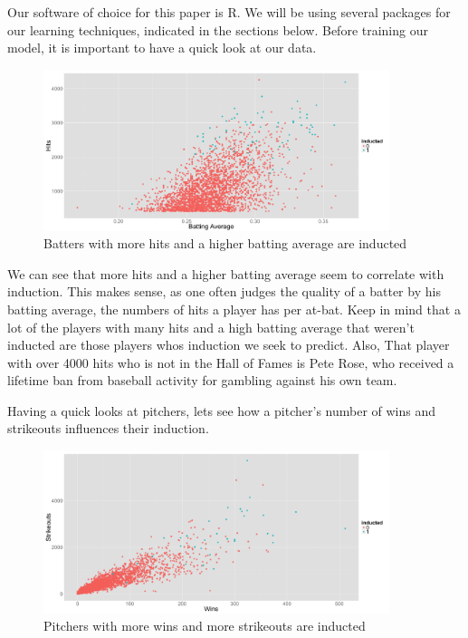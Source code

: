 \documentclass[preprint,12pt]{elsarticle}
\begin{document}
Our software of choice for this paper is R. We will be using several packages for our learning techniques, indicated in the sections below. Before training our model, it is important to have a quick look at our data.

\begin{figure}[h]
	\centering
	\includegraphics[width=0.9\textwidth]{BAandHits}
	\caption{Batters with more hits and a higher batting average are inducted}
\end{figure}

We can see that more hits and a higher batting average seem to correlate with induction. This makes sense, as one often judges the quality of a batter by his batting average, the numbers of hits a player has per at-bat. Keep in mind that a lot of the players with many hits and a high batting average that weren't inducted are those players whos induction we seek to predict. Also, That player with over 4000 hits who is not in the Hall of Fames is Pete Rose, who received a lifetime ban from baseball activity for gambling against his own team.

Having a quick looks at pitchers, lets see how a pitcher's number of wins and strikeouts influences their induction.

\begin{figure}[h]
	\centering
	\includegraphics[width=0.9\textwidth]{WandK}
	\caption{Pitchers with more wins and more strikeouts are inducted}
\end{figure}
\end{document}
